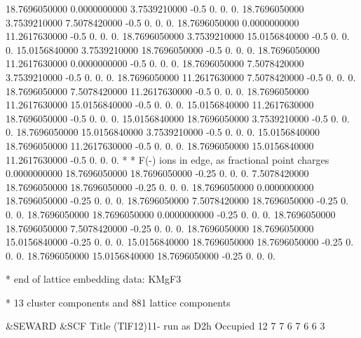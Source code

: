 \begin{inputlisting}
  18.7696050000   0.0000000000   3.7539210000       -0.5  0. 0. 0.
  18.7696050000   3.7539210000   7.5078420000       -0.5  0. 0. 0.
  18.7696050000   0.0000000000  11.2617630000       -0.5  0. 0. 0.
  18.7696050000   3.7539210000  15.0156840000       -0.5  0. 0. 0.
  15.0156840000   3.7539210000  18.7696050000       -0.5  0. 0. 0.
  18.7696050000  11.2617630000   0.0000000000       -0.5  0. 0. 0.
  18.7696050000   7.5078420000   3.7539210000       -0.5  0. 0. 0.
  18.7696050000  11.2617630000   7.5078420000       -0.5  0. 0. 0.
  18.7696050000   7.5078420000  11.2617630000       -0.5  0. 0. 0.
  18.7696050000  11.2617630000  15.0156840000       -0.5  0. 0. 0.
  15.0156840000  11.2617630000  18.7696050000       -0.5  0. 0. 0.
  15.0156840000  18.7696050000   3.7539210000       -0.5  0. 0. 0.
  18.7696050000  15.0156840000   3.7539210000       -0.5  0. 0. 0.
  15.0156840000  18.7696050000  11.2617630000       -0.5  0. 0. 0.
  18.7696050000  15.0156840000  11.2617630000       -0.5  0. 0. 0.
*
* F(-) ions in edge, as fractional point charges
   0.0000000000  18.7696050000  18.7696050000       -0.25  0. 0. 0.
   7.5078420000  18.7696050000  18.7696050000       -0.25  0. 0. 0.
  18.7696050000   0.0000000000  18.7696050000       -0.25  0. 0. 0.
  18.7696050000   7.5078420000  18.7696050000       -0.25  0. 0. 0.
  18.7696050000  18.7696050000   0.0000000000       -0.25  0. 0. 0.
  18.7696050000  18.7696050000   7.5078420000       -0.25  0. 0. 0.
  18.7696050000  18.7696050000  15.0156840000       -0.25  0. 0. 0.
  15.0156840000  18.7696050000  18.7696050000       -0.25  0. 0. 0.
  18.7696050000  15.0156840000  18.7696050000       -0.25  0. 0. 0.

*  end of lattice embedding data: KMgF3

* 13 cluster components  and 881 lattice components

 &SEWARD
 &SCF 
Title
 (TlF12)11- run as D2h
Occupied
 12    7    7    6    7    6    6    3
\end{inputlisting}

